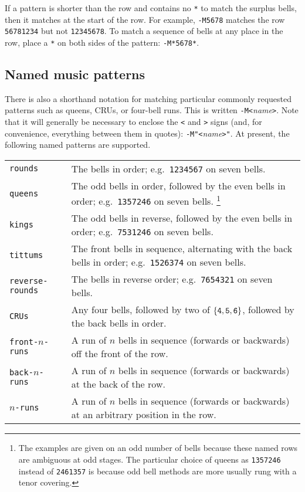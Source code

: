 \documentclass[a4paper,11pt,oneside]{book}
\begin{document}
If a pattern is shorter than the row and contains no \verb+*+ to match the
surplus bells, then it matches at the start of the row.  For example,
\verb+-M5678+ matches the row \verb+56781234+ but not \verb+12345678+.  To
match a sequence of bells at any place in the row, place a \verb+*+ on
both sides of the pattern: \verb+-M*5678*+.

\subsection{Named music patterns}\label{musnamed}

There is also a shorthand notation for matching particular commonly requested
patterns such as queens, CRUs, or four-bell runs.  This is written
\verb+-M<+\textit{name}\verb+>+.  Note that it will generally be necessary to 
enclose the \verb+<+ and \verb+>+ signs (and, for convenience, everything 
between them in quotes): \verb+-M"<+\textit{name}\verb+>"+.%
At present, the following named patterns are supported.

\begin{tabularx}{\textwidth}{lX}
\texttt{rounds}\index{rounds}
  &The bells in order; e.g.\ \texttt{1234567} on seven bells.\\
\texttt{queens}\index{queens}
  &The odd bells in order, followed by the even bells in order;
  e.g.\ \texttt{1357246} on seven bells.%
  \footnote{The examples are given on an odd number of bells because these
  named rows are ambiguous at odd stages.  The particular choice of queens
  as \texttt{1357246} instead of \texttt{2461357} is because odd bell methods
  are more usually rung with a tenor covering.}\\
\texttt{kings}\index{kings}
  &The odd bells in reverse, followed by the even bells in order;
  e.g.\ \texttt{7531246} on seven bells.\\
\texttt{tittums}\index{tittums}
  &The front bells in sequence, alternating with the back bells
  in order; e.g.\ \texttt{1526374} on seven bells.\\
\texttt{reverse-rounds}\index{reverse rounds}&
  The bells in reverse order; e.g.\ \texttt{7654321} on 
  seven bells.\\
\texttt{CRUs}\index{combination roll-up}&
  Any four bells, followed by two of $\{ \hbox{\tt4}, \hbox{\tt5}, 
  \hbox{\tt6}\}$, followed by the back bells in order.\\
\texttt{front-}$n$\texttt{-runs}\index{runs}&
  A run of $n$ bells in sequence 
  (forwards or backwards) off the front of the row.\\
\texttt{back-}$n$\texttt{-runs}&A run of $n$ bells in sequence
  (forwards or backwards) at the back of the row.\\
$n$\texttt{-runs}&A run of $n$ bells in sequence (forwards or backwards) at
  an arbitrary position in the row.\\
\end{tabularx}
\end{document}

